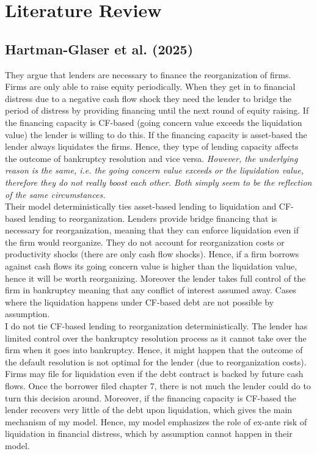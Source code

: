 \documentclass[12pt]{article}
\begin{document}
\section*{Literature Review}

\subsection*{Hartman-Glaser et al. (2025)}
They argue that lenders are necessary to finance the reorganization of firms. Firms are only able to raise equity periodically. When they get in to financial distress due to a negative cash flow shock they need the lender to bridge the period of distress by providing financing until the next round of equity raising. If the financing capacity is CF-based (going concern value exceeds the liquidation value) the lender is willing to do this. If the financing capacity is asset-based the lender always liquidates the firms. Hence, they type of lending capacity affects the outcome of bankruptcy resolution and vice versa. \textit{However, the underlying reason is the same, i.e. the  going concern value exceeds or the liquidation value, therefore they do not really boost each other. Both simply seem to be the reflection of the same circumstances.} \vspace{3mm} \\
Their model deterministically ties asset-based lending to liquidation and CF-based lending to reorganization. Lenders provide bridge financing that is necessary for reorganization, meaning that they can enforce liquidation even if the firm would reorganize. They do not account for reorganization costs or productivity shocks (there are only cash flow shocks). Hence, if a firm borrows against cash flows its going concern value is higher than the liquidation value, hence it will be worth reorganizing. Moreover the lender takes full control of the firm in bankruptcy meaning that any conflict of interest assumed away. Cases where the liquidation happens under CF-based debt are not possible by assumption. \vspace{3mm} \\
I do not tie CF-based lending to reorganization deterministically. The lender has limited control over the bankruptcy resolution process as it cannot take over the firm when it goes into bankruptcy. Hence, it might happen that the outcome of the default resolution is not optimal for the lender (due to reorganization costs). Firms may file for liquidation even if the debt contract is backed by future cash flows. Once the borrower filed chapter 7, there is not much the lender could do to turn this decision around. Moreover, if the financing capacity is CF-based the lender recovers very little of the debt upon liquidation, which gives the main mechanism of my model. Hence, my model emphasizes the role of ex-ante risk of liquidation in financial distress, which by assumption cannot happen in their model. 
\end{document}
